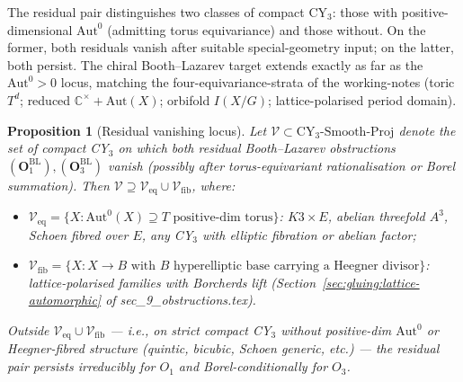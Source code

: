 \documentclass[11pt]{amsart}
\newtheorem{proposition}[theorem]{Proposition}
\newcommand{\bC}{\mathbb{C}}
\newcommand{\Aut}{\mathrm{Aut}}
\begin{document}
The residual pair distinguishes two classes of compact CY$_3$:
those with positive-dimensional $\Aut^0$ (admitting torus
equivariance) and those without. On the former, both residuals
vanish after suitable special-geometry input; on the latter, both
persist. The chiral Booth--Lazarev target extends exactly as far as
the $\Aut^0 > 0$ locus, matching the four-equivariance-strata of
the working-notes (toric $T^d$; reduced $\bC^\times + \Aut(X)$;
orbifold $I(X/G)$; lattice-polarised period domain).

\begin{proposition}[Residual vanishing locus]
\label{prop:residual-vanishing-locus}
Let $\mathcal V \subset \mathrm{CY}_3\text{-Smooth-Proj}$ denote
the set of compact CY$_3$ on which both residual Booth--Lazarev
obstructions $(\mathbf{O}_1^{\mathrm{BL}}), (\mathbf{O}_3^{\mathrm{BL}})$
vanish (possibly after torus-equivariant rationalisation or
Borel summation). Then $\mathcal V \supseteq \mathcal V_{\mathrm{eq}}
\cup \mathcal V_{\mathrm{fib}}$, where:
\begin{itemize}[leftmargin=2em]
\item $\mathcal V_{\mathrm{eq}} = \{X : \Aut^0(X) \supseteq T
\text{ positive-dim torus}\}$: $K3 \times E$, abelian threefold
$A^3$, Schoen fibred over $E$, any CY$_3$ with elliptic fibration
or abelian factor;
\item $\mathcal V_{\mathrm{fib}} = \{X : X \to B
\text{ with } B \text{ hyperelliptic base carrying a Heegner
divisor}\}$: lattice-polarised families with Borcherds lift
(Section~\ref{sec:gluing:lattice-automorphic} of
sec\_9\_obstructions.tex).
\end{itemize}

Outside $\mathcal V_{\mathrm{eq}} \cup \mathcal V_{\mathrm{fib}}$
--- i.e., on strict compact CY$_3$ without positive-dim $\Aut^0$ or
Heegner-fibred structure (quintic, bicubic, Schoen generic, etc.)
--- the residual pair persists irreducibly for $O_1$ and
Borel-conditionally for $O_3$.
\end{proposition}
\end{document}
